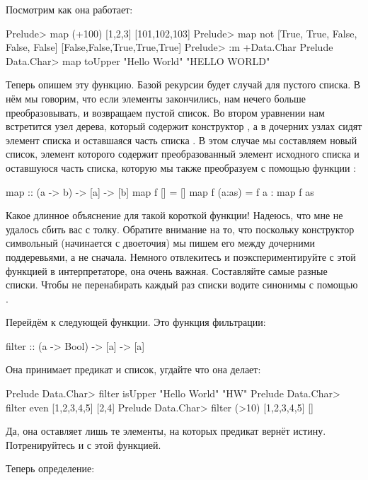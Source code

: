 Посмотрим как она работает:


\begin{code}
Prelude> map (+100) [1,2,3]
[101,102,103]
Prelude> map not [True, True, False, False, False]
[False,False,True,True,True]
Prelude> :m +Data.Char
Prelude Data.Char> map toUpper "Hello World"
"HELLO WORLD"
\end{code}

Теперь опишем эту функцию. Базой рекурсии будет случай для пустого
списка. В нём мы говорим, что если элементы закончились, нам нечего
больше преобразовывать, и возвращаем пустой список. Во втором уравнении
нам встретится узел дерева, который содержит конструктор \In{:}, а в
дочерних узлах сидят элемент списка  и оставшаяся часть списка
. В этом случае мы составляем новый список, элемент которого
содержит преобразованный элемент  исходного списка и
оставшуюся часть списка, которую мы также преобразуем с помощью функции
:


\begin{code}
map :: (a -> b) -> [a] -> [b]
map f []     = []
map f (a:as) = f a : map f as
\end{code}

Какое длинное объяснение для такой короткой функции! Надеюсь, что мне не
удалось сбить вас с толку. Обратите внимание на то, что поскольку
конструктор символьный (начинается с двоеточия) мы пишем его между
дочерними поддеревьями, а не сначала. Немного отвлекитесь и
поэкспериментируйте с этой функцией в интерпретаторе, она очень важная.
Составляйте самые разные списки. Чтобы не перенабирать каждый раз списки
водите синонимы с помощью .

Перейдём к следующей функции. Это функция фильтрации:


\begin{code}
filter :: (a -> Bool) -> [a] -> [a]
\end{code}

Она принимает предикат и список, угдайте что она делает:


\begin{code}
Prelude Data.Char> filter isUpper "Hello World"
"HW"
Prelude Data.Char> filter even [1,2,3,4,5]
[2,4]
Prelude Data.Char> filter (>10) [1,2,3,4,5]
[]
\end{code}

Да, она оставляет лишь те элементы, на которых предикат вернёт истину.
Потренируйтесь и с этой функцией.

Теперь определение:


